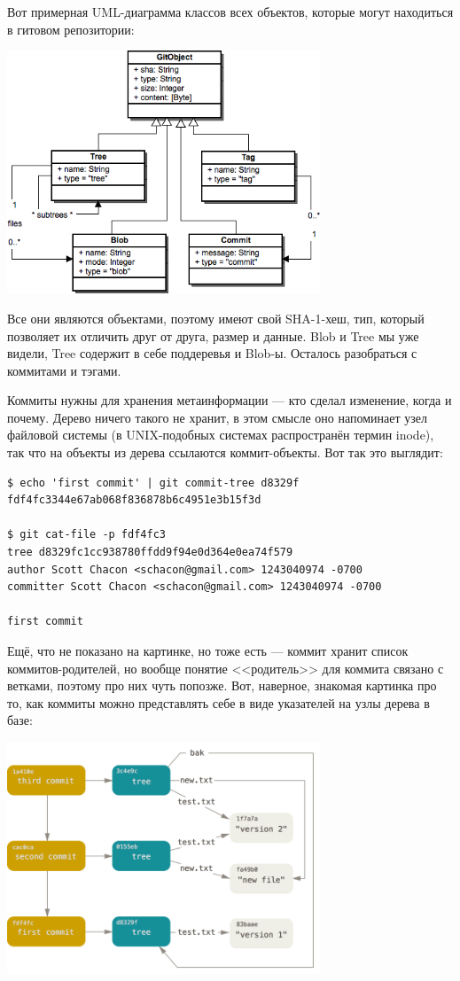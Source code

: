 \documentclass{../../text-style}
\begin{document}
Вот примерная UML-диаграмма классов всех объектов, которые могут находиться в гитовом репозитории:
\begin{center}
	\includegraphics[width=0.7\textwidth]{gitDataStructure.png}
\end{center}

Все они являются объектами, поэтому имеют свой SHA-1-хеш, тип, который позволяет их отличить друг от друга, размер и данные. Blob и Tree мы уже видели, Tree содержит в себе поддеревья и Blob-ы. Осталось разобраться с коммитами и тэгами. 

Коммиты нужны для хранения метаинформации --- кто сделал изменение, когда и почему. Дерево ничего такого не хранит, в этом смысле оно напоминает узел файловой системы (в UNIX-подобных системах распространён термин inode), так что на объекты из дерева ссылаются коммит-объекты. Вот так это выглядит:
\begin{verbatim}
$ echo 'first commit' | git commit-tree d8329f
fdf4fc3344e67ab068f836878b6c4951e3b15f3d

$ git cat-file -p fdf4fc3
tree d8329fc1cc938780ffdd9f94e0d364e0ea74f579
author Scott Chacon <schacon@gmail.com> 1243040974 -0700
committer Scott Chacon <schacon@gmail.com> 1243040974 -0700

first commit
\end{verbatim}

Ещё, что не показано на картинке, но тоже есть --- коммит хранит список коммитов-родителей, но вообще понятие <<родитель>> для коммита связано с ветками, поэтому про них чуть попозже. Вот, наверное, знакомая картинка про то, как коммиты можно представлять себе в виде указателей на узлы дерева в базе:

\begin{center}
	\includegraphics[width=0.7\textwidth]{gitCommitObjects.png}
\end{center}
\end{document}
